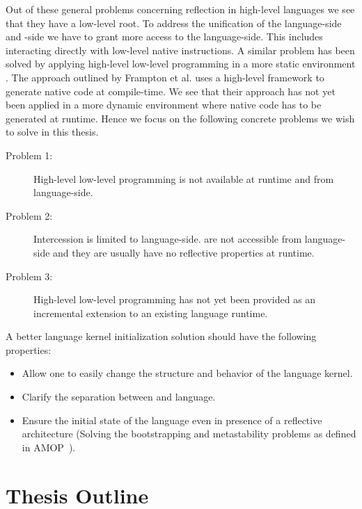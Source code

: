 \noindent Out of these general problems concerning reflection in high-level languages we see that they have a low-level root.
To address the unification of the language-side and \VM-side we have to grant more access to the language-side.
This includes interacting directly with low-level native instructions.
A similar problem has been solved by applying high-level low-level programming in a more static environment \cite{Fram09a,Graal}.
The approach outlined by Frampton et al. uses a high-level framework to generate native code at compile-time.
We see that their approach has not yet been applied in a more dynamic environment where native code has to be generated at runtime.
Hence we focus on the following concrete problems we wish to solve in this thesis.

\begin{description}
	\item[Problem 1:] High-level low-level programming is not available at runtime and from language-side.
	
	\item[Problem 2:] Intercession is limited to language-side.
	\VMs are not accessible from language-side and they are usually have no reflective properties at runtime.
	
	\item[Problem 3:] High-level low-level programming has not yet been provided as an incremental extension to an existing language runtime.
\end{description}



A better language kernel initialization solution should have the following properties:
\begin{itemize}
\item Allow one to easily change the structure and behavior of the language kernel.
\item Clarify the separation between \VM and language.
\item Ensure the initial state of the language even in presence of a reflective architecture (Solving the bootstrapping and metastability problems as defined in AMOP~\cite{Kicz91a}).
\end{itemize}

\section{Thesis Outline}


